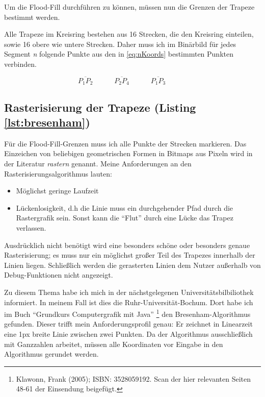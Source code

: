 Um die Flood-Fill durchführen zu können, müssen nun die Grenzen der Trapeze bestimmt werden. 

Alle Trapeze im Kreisring bestehen aus 16 Strecken, die den Kreisring einteilen, sowie 16 obere wie untere Strecken. Daher muss ich im Binärbild für jedes Segment \textit{n} folgende Punkte aus den in \eqref{eq:nKoords} bestimmten Punkten verbinden.
	
\begin{equation}
	\overline{P_1P_2} \hspace{3em}
	\overline{P_2P_4} \hspace{3em}
	\overline{P_1P_3} \hspace{3em}
\end{equation}

\subsection{Rasterisierung der Trapeze (Listing \ref{lst:bresenham})}
Für die Flood-Fill-Grenzen muss ich alle Punkte der Strecken markieren. Das Einzeichen von beliebigen geometrischen Formen in Bitmaps aus Pixeln wird in der Literatur \textit{rastern} genannt. Meine Anforderungen an den Rasterisierungsalgorithmus lauten:
\begin{itemize}
	\item Möglichst geringe Laufzeit
	\item Lückenlosigkeit, d.h die Linie muss ein durchgehender Pfad durch die Rastergrafik sein. Sonst kann die "`Flut"' durch eine Lücke das Trapez verlassen.
\end{itemize}
Ausdrücklich nicht benötigt wird eine besonders schöne oder besonders genaue Rasterisierung; es muss nur ein möglichst großer Teil des Trapezes innerhalb der Linien liegen. Schließlich werden die gerasterten Linien dem Nutzer außerhalb von Debug-Funktionen nicht angezeigt.

Zu diesem Thema habe ich mich in der nächstgelegenen Universitätsbilbiliothek informiert. In meinem Fall ist dies die Ruhr-Universität-Bochum. Dort habe ich im Buch "`Grundkurs Computergrafik mit Java"' \footnote{Klawonn, Frank (2005); ISBN: 3528059192. Scan der hier relevanten Seiten 48-61 der Einsendung beigefügt.} den Bresenham-Algorithmus gefunden. Dieser trifft mein Anforderungsprofil genau: Er zeichnet in Linearzeit eine 1px breite Linie zwischen zwei Punkten. Da der Algorithmus ausschließlich mit Ganzzahlen arbeitet, müssen alle Koordinaten vor Eingabe in den Algorithmus gerundet werden.

